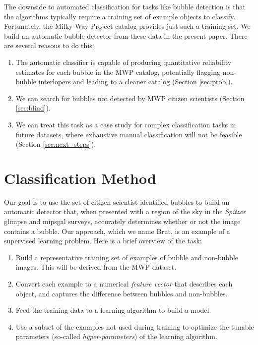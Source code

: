 The downside to automated classification for tasks like bubble detection is that the algorithms typically require a training set of example objects to classify. Fortunately, the Milky Way Project catalog provides just such a training set. We build an automatic bubble detector from these data in the present paper. There are several reasons to do this:

\begin{enumerate}
\item The automatic classifier is capable of producing quantitative reliability estimates for each bubble in the MWP catalog, potentially flagging non-bubble interlopers and leading to a cleaner catalog (Section \ref{sec:prob}).

\item We can search for bubbles not detected by MWP citizen scientists (Section \ref{sec:blind}).

\item We can treat this task as a case study for complex classification tasks in future datasets, where exhaustive manual classification will not be feasible (Section \ref{sec:next_steps}).
\end{enumerate}

\section{Classification Method}
\label{sec:method_ch6_brut}

Our goal is to use the set of citizen-scientist-identified bubbles to build an automatic detector that, when presented with a region of the sky in the  \textit{Spitzer} {\sc glimpse} and {\sc mipsgal} surveys, accurately determines whether or not the image contains a bubble. Our approach, which we name Brut, is an example of a supervised learning problem. Here is a brief overview of the task:

\begin{enumerate}
\item Build a representative training set of examples of bubble and non-bubble images. This will be derived from the MWP dataset.
\item Convert each example to a numerical \textit{feature vector} that describes each object, and captures the difference between bubbles and non-bubbles.
\item Feed the training data to a learning algorithm to build a model.
\item Use a subset of the examples not used during training to optimize the tunable parameters (so-called \textit{hyper-parameters}) of the learning algorithm.
\end{enumerate}

